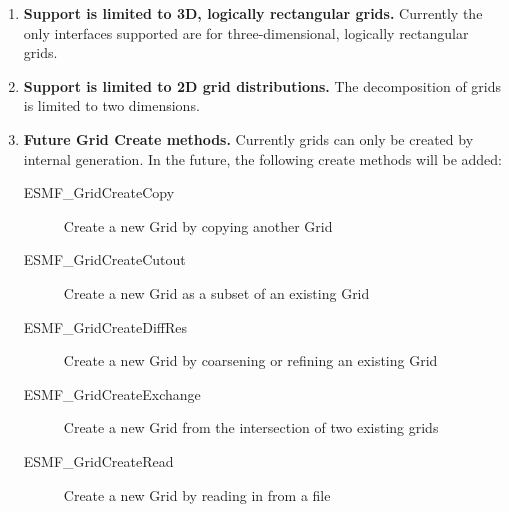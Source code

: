

\begin{enumerate}

\item {\bf Support is limited to 3D, logically rectangular grids.} 
Currently the only interfaces supported are for three-dimensional, 
logically rectangular grids. 

\item {\bf Support is limited to 2D grid distributions.} The 
decomposition of grids is limited to two dimensions.

\item {\bf Future Grid Create methods.}  Currently grids can only
be created by internal generation.  In the future, the following
create methods will be added:
 \begin{description}
    \item [ESMF\_GridCreateCopy]
          Create a new Grid by copying another Grid
    \item [ESMF\_GridCreateCutout]
          Create a new Grid as a subset of an existing Grid
    \item [ESMF\_GridCreateDiffRes]
          Create a new Grid by coarsening or refining an existing Grid
    \item [ESMF\_GridCreateExchange]
          Create a new Grid from the intersection of two existing grids
    \item [ESMF\_GridCreateRead]
          Create a new Grid by reading in from a file
 \end{description}


\end{enumerate}
